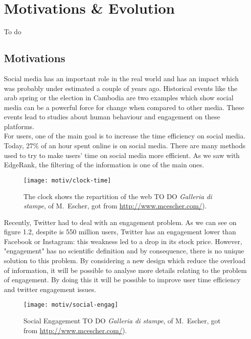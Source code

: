\chapter{Motivations \& Evolution}
To do
\section{Motivations}

Social media has an important role in the real world and has an impact which was probably under
estimated a couple of years ago. Historical events like the arab spring or the election in Cambodia are two 
examples which show social media can be a powerful force for change when compared to other media. 
These events lead to studies about human behaviour and engagement on these platforms.\\
For users, one of the main goal is to increase the time efficiency on social media. Today, 27\% of an hour 
spent online is on social media. There are many methods used to try to make users' time on social media
more efficient.  As we saw with EdgeRank, the filtering of the information is one of the main ones. 

\begin{figure}[tb] 
\centering 
\texttt{[image: motiv/clock-time]} 
\caption[A floating figure]{The clock shows the repartition of the web TO DO  \emph{Galleria di stampe}, of M.~Escher, got from \url{http://www.mcescher.com/}).}
\label{fig:clock} 
\end{figure}

Recently, Twitter had to deal with an engagement problem. As we can see on figure 1.2, despite is 550
million users, Twitter has an engagement lower than Facebook or Instagram: this weakness led to  a drop in
its stock price. However, "engagement" has no scientific definition and by consequence, there is no unique
solution to this problem. By considering a new design which reduce the overload of information, it will be
possible to analyse more details relating to the problem of engagement. By doing this it will be possible to
improve user time efficiency and twitter engagement issues.

\begin{figure}[tb] 
\centering 
\texttt{[image: motiv/social-engag]} 
\caption[A floating figure]{Social Engagement TO DO  \emph{Galleria di stampe}, of M.~Escher, got from \url{http://www.mcescher.com/}).}
\label{fig:engagement} 
\end{figure}

